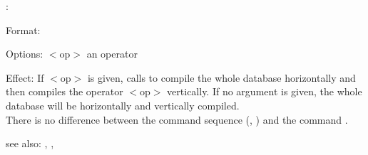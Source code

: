 \compile:

Format: 

Options: $<$op$>$ an operator

Effect: If $<$op$>$ is given,  calls \horizon{} to
        compile the whole \RELFUN{} database  horizontally
	and then compiles the operator $<$op$>$ vertically.
	If no argument is given, the whole database  will
	be horizontally and vertically compiled.\\
	There is no difference between the command sequence
	(\horizon, \verti) and the command .

see also: \consult, \horizon, \verti
